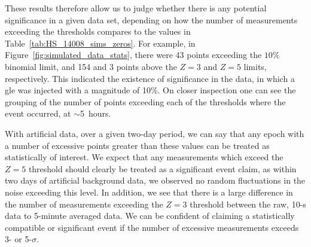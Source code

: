 These results therefore allow us to judge whether there is any potential significance in a given data set, depending on how the number of measurements exceeding the thresholds compares to the values in Table~\ref{tab:HS_14008_sims_zeros}. For example, in Figure~\ref{fig:simulated_data_stats}, there were 43 points exceeding the $10 \%$ binomial limit, and 154 and 3 points above the $Z=3$ and $Z=5$ limits, respectively. This indicated the existence of significance in the data, in which a \gls{gle} was injected with a magnitude of 10\%. On closer inspection one can see the grouping of the number of points exceeding each of the thresholds where the event occurred, at $\sim$5~hours. 


With artificial data, over a given two-day period, we can say that any epoch with a number of excessive points greater than these values can be treated as statistically of interest. We expect that any measurements which exceed the $Z=5$ threshold should clearly be treated as a significant event claim, as within two days of artificial background data, we observed no random fluctuations in the noise exceeding this level. In addition, we see that there is a large difference in the number of measurements exceeding the $Z=3$ threshold between the raw, 10-s data to 5-minute averaged data. We can be confident of claiming a statistically compatible or significant event if the number of excessive measurements exceeds 3- or 5-$\sigma$. %

